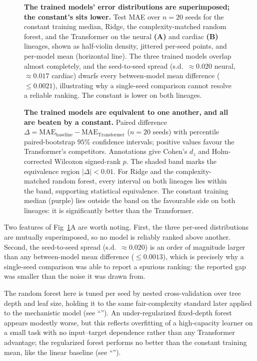 \documentclass[10pt,letterpaper]{article}
\begin{document}
\begin{figure}[!h]
\caption{\textbf{The trained models' error distributions are superimposed; the constant's sits lower.} Test MAE over $n=20$ seeds for the constant training median, Ridge, the complexity-matched random forest, and the Transformer on the neural \textbf{(A)} and cardiac \textbf{(B)} lineages, shown as half-violin density, jittered per-seed points, and per-model mean (horizontal line). The three trained models overlap almost completely, and the seed-to-seed spread (s.d.\ $\approx0.020$ neural, $\approx0.017$ cardiac) dwarfs every between-model mean difference ($\le0.0021$), illustrating why a single-seed comparison cannot resolve a reliable ranking. The constant is lower on both lineages.}
\label{fig:raincloud}
\end{figure}

\begin{figure}[!h]
\caption{\textbf{The trained models are equivalent to one another, and all are beaten by a constant.} Paired difference $\Delta=\mathrm{MAE}_{\text{baseline}}-\mathrm{MAE}_{\text{Transformer}}$ ($n=20$ seeds) with percentile paired-bootstrap $95\%$ confidence intervals; positive values favour the Transformer's competitors. Annotations give Cohen's $d_z$ and Holm-corrected Wilcoxon signed-rank $p$. The shaded band marks the equivalence region $|\Delta|<0.01$. For Ridge and the complexity-matched random forest, every interval on both lineages lies within the band, supporting statistical equivalence. The constant training median (purple) lies outside the band on the favourable side on both lineages: it is significantly better than the Transformer.}
\label{fig:forest}
\end{figure}

Two features of Fig~\ref{fig:raincloud}A are worth noting. First, the three per-seed distributions are mutually superimposed, so no model is reliably ranked above another. Second, the seed-to-seed spread (s.d.\ $\approx 0.020$) is an order of magnitude larger than any between-model mean difference ($\le 0.0013$), which is precisely why a single-seed comparison was able to report a spurious ranking: the reported gap was smaller than the noise it was drawn from.

The random forest here is tuned per seed by nested cross-validation over tree depth and leaf size, holding it to the same fair-complexity standard later applied to the mechanistic model (see ``''). An under-regularized fixed-depth forest appears modestly worse, but this reflects overfitting of a high-capacity learner on a small task with no input--target dependence rather than any Transformer advantage; the regularized forest performs no better than the constant training mean, like the linear baseline (see ``'').
\end{document}
